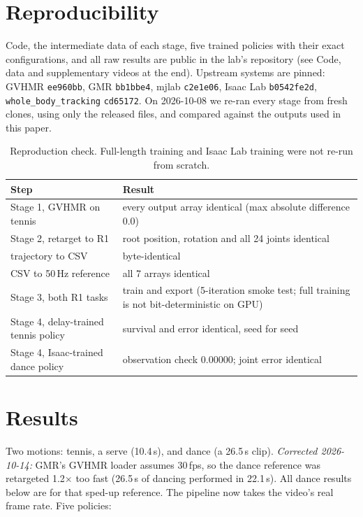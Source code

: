 \documentclass[11pt]{article}
\newcommand{\code}[1]{\texttt{#1}}
\begin{document}
\section{Reproducibility}\label{sec:repro}
Code, the intermediate data of each stage, five trained policies with their exact configurations, and all raw results are public in the lab's repository (see Code, data and supplementary videos at the end). Upstream systems are pinned: GVHMR \code{ee960bb}, GMR \code{bb1bbe4}, mjlab \code{c2e1e06}, Isaac Lab \code{b0542fe2d}, \code{whole\_body\_tracking} \code{cd65172}. On 2026-10-08 we re-ran every stage from fresh clones, using only the released files, and compared against the outputs used in this paper.

\begin{table}[!htbp]
\centering\small
\caption{Reproduction check. Full-length training and Isaac Lab training were not re-run from scratch.}
\label{tab:repro}
\begin{tabularx}{\linewidth}{@{}p{5.2cm}X@{}}
\toprule
Step & Result\\
\midrule
Stage 1, GVHMR on tennis & every output array identical (max absolute difference 0.0)\\
Stage 2, retarget to R1 & root position, rotation and all 24 joints identical\\
trajectory to CSV & byte-identical\\
CSV to 50\,Hz reference & all 7 arrays identical\\
Stage 3, both R1 tasks & train and export (5-iteration smoke test; full training is not bit-deterministic on GPU)\\
Stage 4, delay-trained tennis policy & survival and error identical, seed for seed\\
Stage 4, Isaac-trained dance policy & observation check 0.00000; joint error identical\\
\bottomrule
\end{tabularx}
\end{table}

\section{Results}\label{sec:results}
Two motions: tennis, a serve (10.4\,s), and dance (a 26.5\,s clip). \emph{Corrected 2026-10-14:} GMR's GVHMR loader assumes 30\,fps, so the dance reference was retargeted 1.2$\times$ too fast (26.5\,s of dancing performed in 22.1\,s). All dance results below are for that sped-up reference. The pipeline now takes the video's real frame rate. Five policies:
\end{document}
